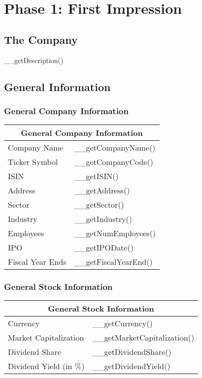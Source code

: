 \section{Phase 1: First Impression}

\subsection{The Company}

__getDescription()

\subsection{General Information}

\subsubsection{General Company Information}

\begin{tabularx}{\textwidth}{|X|X|}
 \hline
 \multicolumn{2}{|c|}{General Company Information} \\
 \hline
 Company Name     & __getCompanyName() \\
 Ticker Symbol    & __getCompanyCode() \\
 ISIN             & __getISIN() \\
 Address          & __getAddress() \\
 Sector           & __getSector() \\
 Industry         & __getIndustry() \\
 Employees        & __getNumEmployees() \\
 IPO              & __getIPODate() \\
 Fiscal Year Ends & __getFiscalYearEnd() \\
 \hline
\end{tabularx}

\subsubsection{General Stock Information}

\begin{tabularx}{\textwidth}{|X|X|}
 \hline
 \multicolumn{2}{|c|}{General Stock Information} \\
 \hline
 Currency               & __getCurrency() \\
 Market Capitalization  & __getMarketCapitalization() \\
 Dividend Share         & __getDividendShare() \\
 Dividend Yield (in \%) & __getDividendYield() \\
 \hline
\end{tabularx}

